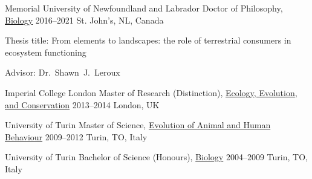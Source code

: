 

\begin{cventries}

  \cventry
    {Memorial University of Newfoundland and Labrador} %
    {Doctor of Philosophy, \href{http://www.mun.ca/biology}{Biology}} %
    {2016--2021} %
    {St. John's, NL, Canada} %
    {
      \begin{cvitems} %
        \item {Thesis title: From elements to landscapes: the role of terrestrial consumers in ecosystem functioning}
        \item {Advisor: Dr.~Shawn~J.~Leroux}
      \end{cvitems}
    }

  \cventry
    {Imperial College London} %
    {Master of Research (Distinction), \href{https://www.imperial.ac.uk/study/pg/life-sciences/ecology-evolution-conservation-research/}{Ecology, Evolution, and Conservation}} %
    {2013--2014} %
    {London, UK} %
    {}
  
  \cventry
    {University of Turin} %
    {Master of Science, \href{https://goo.gl/rCzbq7}{Evolution of Animal and Human Behaviour}} %
    {2009--2012} %
    {Turin, TO, Italy} %
    {}
  
  \cventry
    {University of Turin} %
    {Bachelor of Science (Honours), \href{http://biologia.campusnet.unito.it/do/home.pl}{Biology}} %
    {2004--2009} %
    {Turin, TO, Italy} %
    {}
\end{cventries}

